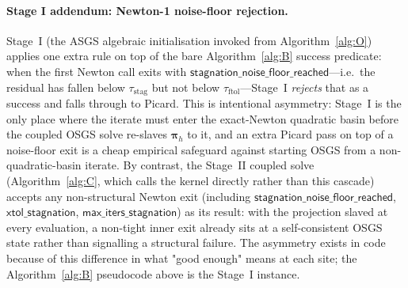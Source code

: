 \documentclass{article}
\newcommand{\textftol}{\tau_{\mathrm{ftol}}}
\newcommand{\textstag}{\tau_{\mathrm{stag}}}
\begin{document}
\paragraph{Stage I addendum: Newton-1 noise-floor rejection.}  Stage~I
(the ASGS algebraic initialisation invoked from Algorithm~\ref{alg:O})
applies one extra rule on top of the bare Algorithm~\ref{alg:B} success
predicate: when the first Newton call exits with
$\mathsf{stagnation\_noise\_floor\_reached}$---i.e.\ the residual has
fallen below $\textstag$ but not below $\textftol$---Stage~I
\emph{rejects} that as a success and falls through to Picard. This
is intentional asymmetry: Stage~I is the only place where the iterate
must enter the exact-Newton quadratic basin before the coupled OSGS
solve re-slaves $\boldsymbol{\pi}_h$ to it, and an extra Picard pass
on top of a noise-floor exit is a cheap empirical safeguard against
starting OSGS from a non-quadratic-basin iterate. By contrast, the
Stage~II coupled solve (Algorithm~\ref{alg:C}, which calls the kernel
directly rather than this cascade) accepts any non-structural Newton
exit (including $\mathsf{stagnation\_noise\_floor\_reached}$,
$\mathsf{xtol\_stagnation}$, $\mathsf{max\_iters\_stagnation}$) as its
result: with the projection slaved at every evaluation, a non-tight
inner exit already sits at a self-consistent OSGS state rather than
signalling a structural failure. The asymmetry exists in code because
of this difference in what "good enough" means at each site; the
Algorithm~\ref{alg:B} pseudocode above is the Stage~I instance.
\end{document}

